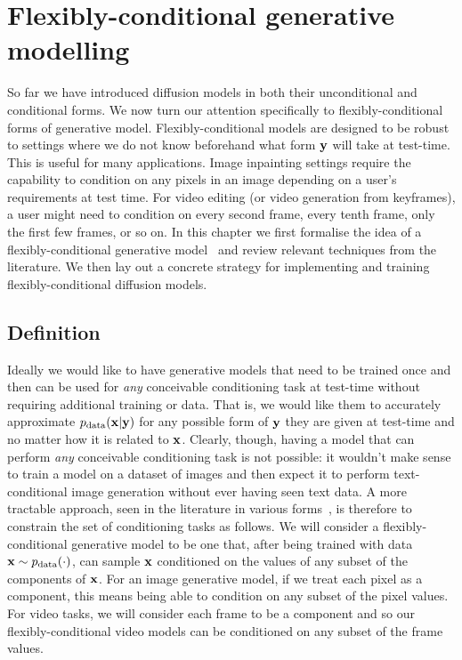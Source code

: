 \chapter{Flexibly-conditional generative modelling}
\label{ch:flexible-diffusion}

So far we have introduced diffusion models in both their unconditional and conditional forms. We now turn our attention specifically to flexibly-conditional forms of generative model. 
%
Flexibly-conditional models are designed to be robust to settings where we do not know beforehand what form ${\mathbf{y}}$ will take at test-time. This is useful for many applications. Image inpainting settings require the capability to condition on any pixels in an image depending on a user's requirements at test time. For video editing (or video generation from keyframes), a user might need to condition on every second frame, every tenth frame, only the first few frames, or so on. In this chapter we first formalise the idea of a flexibly-conditional generative model~\citep{ivanov2018variational} and review relevant techniques from the literature. We then lay out a concrete strategy for implementing and training flexibly-conditional diffusion models.


\section{Definition}
Ideally we would like to have generative models that need to be trained once and then can be used for \textit{any} conceivable conditioning task at test-time without requiring additional training or data. That is, we would like them to accurately approximate $p_{\rm{data}}({\mathbf{x}}|{\mathbf{y}})$ for any possible form of ${\mathbf{y}}$ they are given at test-time and no matter how it is related to ${\mathbf{x}}$. Clearly, though, having a model that can perform \textit{any} conceivable conditioning task is not possible: it wouldn't make sense to train a model on a dataset of images and then expect it to perform text-conditional image generation without ever having seen text data. 
%
%
A more tractable approach, seen in the literature in various forms~\citep{ivanov2018variational,tashiro2021csdi,garnelo2018neural}, is therefore to constrain the set of conditioning tasks as follows. We will consider a flexibly-conditional generative model to be one that, after being trained with data ${\mathbf{x}} \sim p_{\rm{data}}(\cdot)$, can sample ${\mathbf{x}}$ conditioned on the values of any subset of the components of ${\mathbf{x}}$. For an image generative model, if we treat each pixel as a component, this means being able to condition on any subset of the pixel values. For video tasks, we will consider each frame to be a component and so our flexibly-conditional video models can be conditioned on any subset of the frame values.

